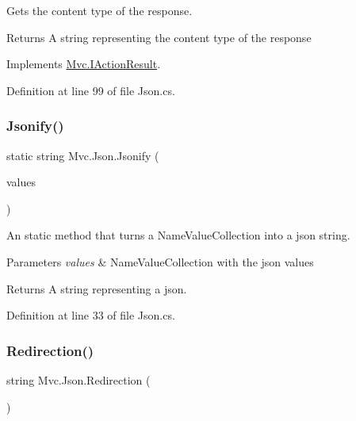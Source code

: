 Gets the content type of the response. 

\begin{DoxyReturn}{Returns}
A string representing the content type of the response
\end{DoxyReturn}


Implements \hyperlink{interface_mvc_1_1_i_action_result_a8ad08f29bba90dfbe06d7a00465af10a}{Mvc.\+I\+Action\+Result}.



Definition at line 99 of file Json.\+cs.

\mbox{\label{class_mvc_1_1_json_a7f2eac02ea84b7b0c9c277d54e347c8a}} 
\subsubsection{\texorpdfstring{Jsonify()}{Jsonify()}}
{\footnotesize\ttfamily static string Mvc.\+Json.\+Jsonify (\begin{DoxyParamCaption}\item[{Name\+Value\+Collection}]{values }\end{DoxyParamCaption})\hspace{0.3cm}{\ttfamily [static]}}



An static method that turns a Name\+Value\+Collection into a json string. 


\begin{DoxyParams}{Parameters}
{\em values} & Name\+Value\+Collection with the json values\\
\hline
\end{DoxyParams}
\begin{DoxyReturn}{Returns}
A string representing a json.
\end{DoxyReturn}


Definition at line 33 of file Json.\+cs.

\mbox{\label{class_mvc_1_1_json_af8cd874b2a4c9692f0200bde97d40c87}} 
\subsubsection{\texorpdfstring{Redirection()}{Redirection()}}
{\footnotesize\ttfamily string Mvc.\+Json.\+Redirection (\begin{DoxyParamCaption}{ }\end{DoxyParamCaption})}



